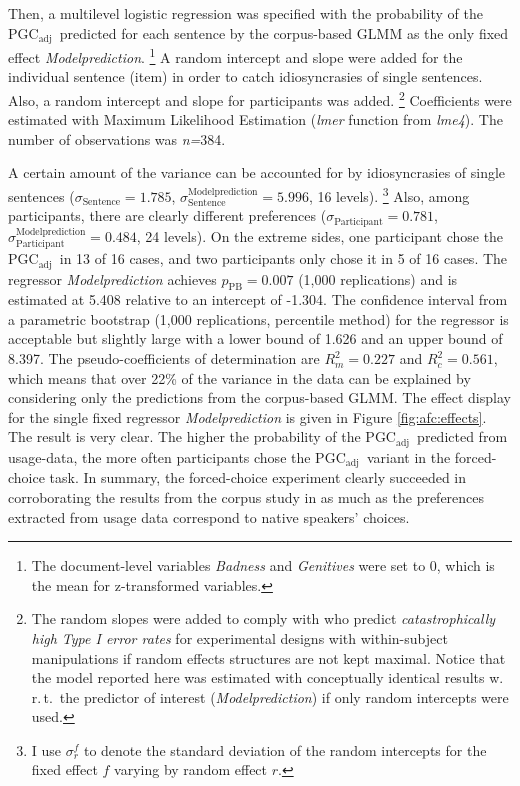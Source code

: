 \documentclass[USenglish]{article}
\newcommand{\wrt}{w.\,r.\,t.\ }
\newcommand{\Sub}[1]{\ensuremath{\mathrm{_{#1}}}}
\newcommand{\mpPB}{\ensuremath{p_{\text{PB}}}}
\newcommand{\PGCa}{PGC\Sub{adj}}
\begin{document}
Then, a multilevel logistic regression was specified with the probability of the \PGCa\ predicted for each sentence by the corpus-based GLMM as the only fixed effect \textit{Modelprediction}.%
\footnote{The document-level variables \textit{Badness} and \textit{Genitives} were set to 0, which is the mean for z-transformed variables.}
A random intercept and slope were added for the individual sentence (item) in order to catch idiosyncrasies of single sentences.
Also, a random intercept and slope for participants was added.%
\footnote{The random slopes were added to comply with \citet[257]{BarrEa2013} who predict \textit{catastrophically high Type I error rates} for experimental designs with within-subject manipulations if random effects structures are not kept maximal.
Notice that the model reported here was estimated with conceptually identical results \wrt the predictor of interest (\textit{Modelprediction}) if only random intercepts were used.}
Coefficients were estimated with Maximum Likelihood Estimation (\textit{lmer} function from \textit{lme4}).
The number of observations was \textit{n=}384.

A certain amount of the variance can be accounted for by idiosyncrasies of single sentences ($\sigma_{\text{Sentence}}=1.785$, $\sigma^{\text{Modelprediction}}_{\text{Sentence}}=5.996$, 16 levels).%
\footnote{I use $\sigma^f_r$ to denote the standard deviation of the random intercepts for the fixed effect $f$ varying by random effect $r$.}
Also, among participants, there are clearly different preferences ($\sigma_{\text{Participant}}=0.781$, $\sigma^{\text{Modelprediction}}_{\text{Participant}}=0.484$, 24 levels).
On the extreme sides, one participant chose the \PGCa\ in 13 of 16 cases, and two participants only chose it in 5 of 16 cases.
The regressor \textit{Modelprediction} achieves $\mpPB=0.007$ (1,000 replications) and is estimated at 5.408 relative to an intercept of -1.304.
The confidence interval from a parametric bootstrap (1,000 replications, percentile method) for the regressor is acceptable but slightly large with a lower bound of 1.626 and an upper bound of 8.397.
The pseudo-coefficients of determination are $R^2_{m}=0.227$ and $R^2_{c}=0.561$, which means that over 22\% of the variance in the data can be explained by considering only the predictions from the corpus-based GLMM.
The effect display for the single fixed regressor \textit{Modelprediction} is given in Figure \ref{fig:afc:effects}.
The result is very clear.
The higher the probability of the \PGCa\ predicted from usage-data, the more often participants chose the \PGCa\ variant in the forced-choice task.
In summary, the forced-choice experiment clearly succeeded in corroborating the results from the corpus study in as much as the preferences extracted from usage data correspond to native speakers' choices.
\end{document}
